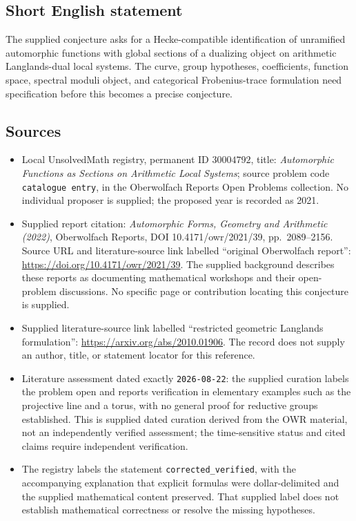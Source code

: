\documentclass[11pt]{article}
\begin{document}
\subsection{Short English statement}
The supplied conjecture asks for a Hecke-compatible identification of unramified automorphic functions with global sections of a dualizing object on arithmetic Langlands-dual local systems. The curve, group hypotheses, coefficients, function space, spectral moduli object, and categorical Frobenius-trace formulation need specification before this becomes a precise conjecture.
\subsection{Sources}
\begin{itemize}
\item Local UnsolvedMath registry, permanent ID \(30004792\), title: \emph{Automorphic Functions as Sections on Arithmetic Local Systems}; source problem code \texttt{catalogue entry}, in the Oberwolfach Reports Open Problems collection. No individual proposer is supplied; the proposed year is recorded as 2021.
\item Supplied report citation: \emph{Automorphic Forms, Geometry and Arithmetic (2022)}, Oberwolfach Reports, DOI 10.4171/owr/2021/39, pp.~2089--2156. Source URL and literature-source link labelled ``original Oberwolfach report'': \url{https://doi.org/10.4171/owr/2021/39}. The supplied background describes these reports as documenting mathematical workshops and their open-problem discussions. No specific page or contribution locating this conjecture is supplied.
\item Supplied literature-source link labelled ``restricted geometric Langlands formulation'': \url{https://arxiv.org/abs/2010.01906}. The record does not supply an author, title, or statement locator for this reference.
\item Literature assessment dated exactly \texttt{2026-08-22}: the supplied curation labels the problem open and reports verification in elementary examples such as the projective line and a torus, with no general proof for reductive groups established. This is supplied dated curation derived from the OWR material, not an independently verified assessment; the time-sensitive status and cited claims require independent verification.
\item The registry labels the statement \texttt{corrected\_verified}, with the accompanying explanation that explicit formulas were dollar-delimited and the supplied mathematical content preserved. That supplied label does not establish mathematical correctness or resolve the missing hypotheses.
\end{itemize}
\end{document}
